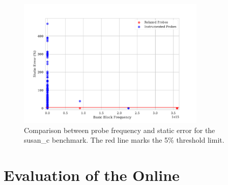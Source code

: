 \begin{figure}[H]
    \centering
    \includegraphics[width=0.8\textwidth]{figs/susan_c.pdf}
    \caption{Comparison between probe frequency and static error for the {\flagstype susan\_c} benchmark. The red line marks the 5\% threshold limit.}
    \label{fig:susan_c-probes-err-freq}
\end{figure}



\section{Evaluation of the Online {\IterComp}}

